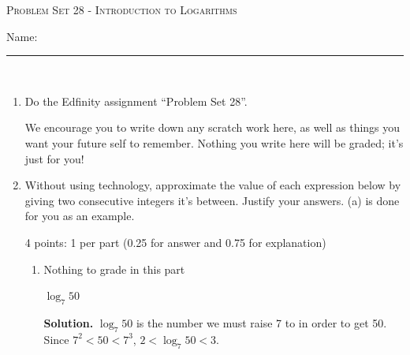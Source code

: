 \documentclass{article}
\newcommand{\doedfinity}[2][\newpage]{
  \begin{problem}[#1]
    Do the Edfinity assignment ``Problem Set #2''.

    We encourage you to write down any scratch work here, as well as
    things you want your future self to remember. Nothing you write
    here will be graded; it's just for you!
  \end{problem}
}
\begin{document}
\begin{center}
  \large\textsc{Problem Set 28 - Introduction to Logarithms}\vspace{.5in}\\
  \begin{problemonly}
   \large Name: \rule{5cm}{0.15mm}\\
   \end{problemonly}
\end{center}

\begin{enumerate}
\item  {}

  \doedfinity{28}

\item %

  Without using technology, approximate the value of each expression below by giving two consecutive integers it's between. Justify your answers. (a) is done for you as an example.

  \begin{grading}
    4 points: 1 per part (0.25 for answer and 0.75 for explanation) 
  \end{grading}

  \begin{enumerate}

  \item

    \begin{grading}
      Nothing to grade in this part
    \end{grading}

    $\log_7 50$

    \textbf{Solution.} $\log_{7} 50$ is the number we must raise 7 to in order to get 50. Since $7^2 < 50 < 7^3$, $\boxed{2 < \log_{7} 50 < 3}$.


\end{enumerate}
\end{enumerate}
\end{document}
